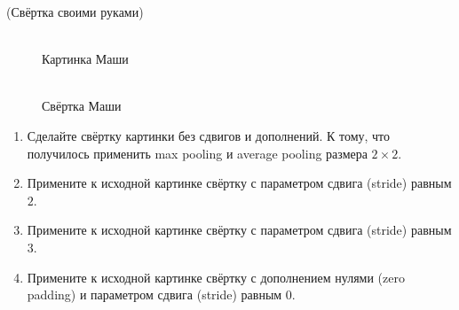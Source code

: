 \begin{problem}{(Свёртка своими руками)}
\begin{figure}[H]
\begin{minipage}{0.49\linewidth}
        \\ Картинка Маши
    \end{minipage} 
    \hfill
    \begin{minipage}{0.49\linewidth} 
        \centering
        \\ Свёртка Маши
    \end{minipage} 
    \end{figure}
    \begin{enumerate} 
        \item Сделайте свёртку картинки без сдвигов и дополнений. К тому, что получилось применить max pooling и average pooling размера $2 \times 2$.
        \item Примените к исходной картинке свёртку с параметром сдвига (stride) равным $2$.
        \item Примените к исходной картинке свёртку с параметром сдвига (stride) равным $3$.
        \item Примените к исходной картинке свёртку с дополнением нулями (zero padding) и параметром сдвига (stride) равным $0$.
    \end{enumerate} 
\end{problem}


